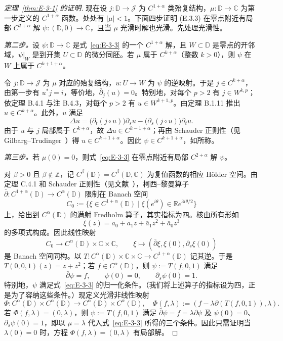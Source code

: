 \begin{proof}[定理~\ref{thm:E-3-1} 的证明]
现在设 $j:\mathbb D\to\mathcal J$ 为 $C^{1+\alpha}$ 类殆复结构，$\mu:\mathbb D\to\mathbb C$ 为第一步定义的 $C^{1+\alpha}$ 函数。处处有 $|\mu|<1$。下面四步证明 (E.3.3) 在零点附近有局部 $C^{2+\alpha}$ 解 $\psi:(\mathbb D,0)\to\mathbb C$，且当 $\mu$ 光滑时解也光滑。先处理光滑性。

\emph{第二步。}设 $\psi:\mathbb D\to\mathbb C$ 是式~\eqref{eq:E-3-3} 的一个 $C^{1+\alpha}$ 解，且 $W\subset\mathbb D$ 是零点的开邻域，$\psi|_W$ 是到开集 $U\subset\mathbb D$ 的微分同胚。若 $\mu$ 属于 $C^{k+\alpha}$（整数 $k>0$），则 $\psi$ 在 $W$ 上属于 $C^{k+1+\alpha}$。

令 $j:\mathbb D\to\mathcal J$ 为 $\mu$ 对应的殆复结构，$u:U\to W$ 为 $\psi$ 的逆映射。于是 $j\in C^{k+\alpha}$，由第一步有 $u^*j=i$，等价地，$\bar\partial_j(u)=0$。特别地，对每个 $p>2$ 有 $j\in W^{k,p}$；依定理 B.4.1 与注 B.4.3，对每个 $p>2$ 有 $u\in W^{k+1,p}$。由定理 B.1.11 推出 $u\in C^{k+\alpha}$。此外，$u$ 满足
\[
  \Delta u=\bigl(\partial_t(j\circ u)\bigr)\partial_su
           -\bigl(\partial_s(j\circ u)\bigr)\partial_tu.
\]
由于 $u$ 与 $j$ 局部属于 $C^{k+\alpha}$，故 $\Delta u\in C^{k-1+\alpha}$；再由 Schauder 正则性（见 Gilbarg--Trudinger~）得 $u\in C^{k+1+\alpha}$。因此 $\psi\in C^{k+1+\alpha}$，如所称。

\emph{第三步。}若 $\mu(0)=0$，则式~\eqref{eq:E-3-3} 在零点附近有局部 $C^{2+\alpha}$ 解 $\psi$。

对 $\beta>0$ 且 $\beta\notin\mathbb Z$，记 $C^\beta(\mathbb D)=C^\beta(\mathbb D,\mathbb C)$ 为复值函数的相应 Hölder 空间。由定理 C.4.1 和 Schauder 正则性（见文献~），柯西--黎曼算子 $\bar\partial:C^{1+\alpha}(\mathbb D)\to C^\alpha(\mathbb D)$ 限制在 Banach 空间
\[
  C_0:=\{\xi\in C^{1+\alpha}(\mathbb D)\mid
  \xi(e^{i\theta})\in\mathbb R e^{3i\theta/2}\}
\]
上，给出到 $C^\alpha(\mathbb D)$ 的满射 Fredholm 算子，其实指标为四。核由所有形如
\[
  \xi(z)=a_0+a_1z+\bar a_1z^2+\bar a_0z^3
\]
的多项式构成。因此线性映射
\[
  C_0\longrightarrow C^\alpha(\mathbb D)\times\mathbb C\times\mathbb C,
  \qquad \xi\longmapsto(\bar\partial\xi,\xi(0),\partial_s\xi(0))
\]
是 Banach 空间同构。以 $T:C^\alpha(\mathbb D)\times\mathbb C\times\mathbb C\to C^{1+\alpha}(\mathbb D)$ 记其逆。于是 $T(0,0,1)(z)=z+z^2$；若 $f\in C^\alpha(\mathbb D)$，则 $\psi:=T(f,0,1)$ 满足
\[
  \bar\partial\psi=f,\qquad \psi(0)=0,\qquad \partial_s\psi(0)=1.
\]
特别地，$\psi$ 满足式~\eqref{eq:E-3-3} 的归一化条件。（我们将上述算子的指标设为四，正是为了容纳这些条件。）现定义光滑非线性映射
\[
  \Phi:C^\alpha(\mathbb D)\times C^\alpha(\mathbb D)
  \longrightarrow C^\alpha(\mathbb D)\times C^\alpha(\mathbb D),
  \quad \Phi(f,\lambda):=(f-\lambda\partial(T(f,0,1)),\lambda).
\]
若 $\Phi(f,\lambda)=(0,\lambda)$，则 $\psi:=T(f,0,1)$ 满足 $\bar\partial\psi=f=\lambda\partial\psi$ 及 $\psi(0)=0$、$\partial_s\psi(0)=1$，即以 $\mu=\lambda$ 代入式~\eqref{eq:E-3-3} 所得的三个条件。因此只需证明当 $\lambda(0)=0$ 时，方程 $\Phi(f,\lambda)=(0,\lambda)$ 有局部解。


\end{proof}
